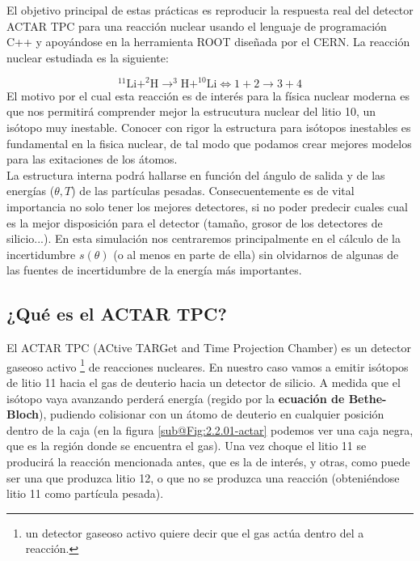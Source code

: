 \documentclass[12pt,a4paper]{article}
\numberwithin{equation}{section}
\numberwithin{figure}{section}
\begin{document}
El objetivo principal de estas prácticas es reproducir la respuesta real del detector ACTAR TPC para una reacción nuclear usando el lenguaje de programación C++ y apoyándose en la herramienta ROOT diseñada por el CERN. La reacción nuclear estudiada es la siguiente:

\begin{equation}
    ^{11}\mathrm{Li}+^2\mathrm{H} \rightarrow ^3\mathrm{H}+^{10}\mathrm{Li} \Longleftrightarrow 1 + 2 \rightarrow 3 + 4
\end{equation}
El motivo por el cual esta reacción es de interés para la física nuclear moderna es que nos permitirá comprender mejor la estrucutura nuclear del litio 10, un isótopo muy inestable. Conocer con rigor la estructura para isótopos inestables es fundamental en la fisica nuclear, de tal modo que podamos crear mejores modelos para las exitaciones de los átomos.  \\

La estructura interna podrá hallarse en función del ángulo de salida y de las energías ($\theta, T$) de las partículas pesadas. Consecuentemente es de vital importancia no solo tener los mejores detectores, si no poder predecir cuales cual es la mejor disposición para el detector (tamaño, grosor de los detectores de silicio...). En esta simulación nos centraremos principalmente en el cálculo de la incertidumbre $s(\theta)$ (o al menos en parte de ella) sin olvidarnos de algunas de las fuentes de incertidumbre de la energía más importantes.
\subsection{¿Qué es el ACTAR TPC?}

El ACTAR TPC (ACtive TARGet and Time Projection Chamber) es un detector gaseoso activo \footnote{un detector gaseoso activo quiere decir que el gas actúa dentro del a reacción.} de reacciones nucleares. En nuestro caso vamos a emitir isótopos de litio 11 hacia el gas de deuterio hacia un detector de silicio. A medida que el isótopo vaya avanzando perderá energía (regido por la {\bf ecuación de Bethe-Bloch}), pudiendo colisionar con un átomo de deuterio en cualquier posición dentro de la caja (en la figura \ref{sub@Fig:2.2.01-actar} podemos ver una caja negra, que es la región donde se encuentra el gas). Una vez choque el litio 11 se producirá la reacción mencionada antes, que es la de interés, y otras, como puede ser una que produzca litio 12, o que no se produzca una reacción (obteniéndose litio 11 como partícula pesada).   \\
\end{document}
